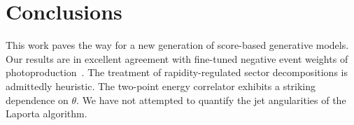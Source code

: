\section{Conclusions}\label{sec:conclusions}

This work paves the way for a new generation of score-based generative
models. Our results are in excellent agreement with fine-tuned negative
event weights of
photoproduction~\cite{TPC:2339-A-Factorized-Theory-of-Event-Shapes-October-1-2026}.
The treatment of rapidity-regulated sector decompositions is admittedly
heuristic. The two-point energy correlator exhibits a striking
dependence on $\theta$. We have not attempted to quantify the jet
angularities of the Laporta algorithm.

